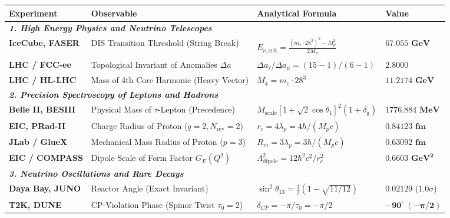 \documentclass[12pt,a4paper]{article}
\begin{document}
\begin{table}[H]
\centering
\footnotesize
\setlength{\tabcolsep}{3pt}       %
\renewcommand{\arraystretch}{1.15} %
\begin{tabularx}{\textwidth}{p{2.8cm} p{4.6cm} p{4.6cm} >{\raggedleft\arraybackslash}X}
\toprule
\textbf{Experiment} & \textbf{Observable} & \textbf{Analytical Formula} & \textbf{Value} \\
\midrule
\multicolumn{4}{l}{\textit{\textbf{1. High Energy Physics and Neutrino Telescopes}}} \\
\textbf{IceCube, FASER} & DIS Transition Threshold (String Break) & $E_{\nu, \text{crit}} = \frac{(m_e \cdot 28^3)^2 - M_p^2}{2M_p}$ & $\mathbf{67.055 \text{ GeV}}$ \\
\textbf{LHC / FCC-ee} & Topological Invariant of Anomalies $\Delta a$ & $\Delta a_\tau / \Delta a_\mu = (15 - 1)/(6 - 1)$ & $\mathbf{2.8000}$ \\
\textbf{LHC / HL-LHC} & Mass of 4th Core Harmonic (Heavy Vector) & $M_4 = m_e \cdot 28^3$ & $\mathbf{11.2174 \text{ GeV}}$ \\
\midrule
\multicolumn{4}{l}{\textit{\textbf{2. Precision Spectroscopy of Leptons and Hadrons}}} \\
\textbf{Belle II, BESIII} & Physical Mass of $\tau$-Lepton (Precedence) & $M_{\text{scale}} [1+\sqrt{2}\cos\theta_1]^2 (1+\delta_{\text{g}})$ & $\mathbf{1776.884 \text{ MeV}}$ \\
\textbf{EIC, PRad-II} & Charge Radius of Proton ($q=2, N_{\text{rev}}=2$) & $r_c = 4\lambda_p = 4\hbar / (M_p c)$ & $\mathbf{0.84123 \text{ fm}}$ \\
\textbf{JLab / GlueX} & Mechanical Mass Radius of Proton ($p=3$) & $R_m = 3\lambda_p = 3\hbar / (M_p c)$ & $\mathbf{0.63092 \text{ fm}}$ \\
\textbf{EIC / COMPASS} & Dipole Scale of Form Factor $G_E(Q^2)$ & $\Lambda_{\text{dipole}}^2 = 12\hbar^2 c^2 / r_c^2$ & $\mathbf{0.6603 \text{ GeV}^2}$ \\
\midrule
\multicolumn{4}{l}{\textit{\textbf{3. Neutrino Oscillations and Rare Decays}}} \\
\textbf{Daya Bay, JUNO} & Reactor Angle (Exact Invariant) & $\sin^2\theta_{13} = \frac{1}{2}(1 - \sqrt{11/12})$ & $\mathbf{0.02129}$ ($1.0\sigma$) \\
\textbf{T2K, DUNE} & CP-Violation Phase (Spinor Twist $\tau_0=2$) & $\delta_{CP} = -\pi / \tau_0 = -\pi/2$ & $\mathbf{-90^\circ \ (-\pi/2)}$ \\

\end{tabularx}
\end{table}
\end{document}
